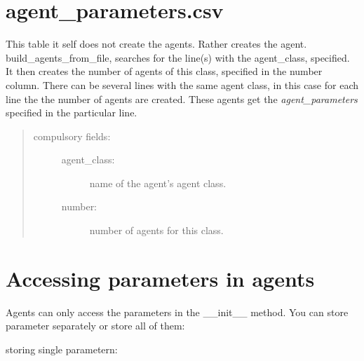 \documentclass[letterpaper,10pt,english]{sphinxmanual}
\begin{document}
\section{agent\_parameters.csv}
\label{parameters:agent-parameters-csv}
This table it self does not create the agents. Rather {\hyperref[simulation:abce.Simulation.build_agents_from_file]{}}
creates the agent. build\_agents\_from\_file, searches for the line(s) with the agent\_class,
specified. It then creates the number of agents of this class, specified in the number
column.
There can be several lines with the same agent class, in this case for each line the the number
of agents are created. These agents get the \emph{agent\_parameters} specified in the particular line.
\begin{quote}
\begin{description}
\item[{compulsory fields:}] \leavevmode\begin{description}
\item[{agent\_class:}] \leavevmode
name of the agent's agent class.

\item[{number:}] \leavevmode
number of agents for this class.

\end{description}

\end{description}
\end{quote}


\section{Accessing parameters in agents}
\label{parameters:accessing-parameters-in-agents}
Agents can only access the parameters in the \_\_init\_\_ method.
You can store parameter separately or store all of them:

storing single parametern:
\end{document}
